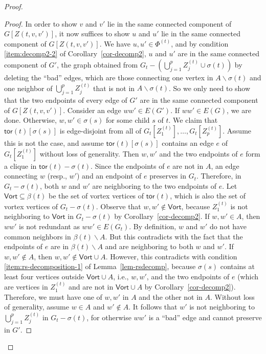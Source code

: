 \documentclass[a4paper,11pt]{article}
\numberwithin{lemma}{section}
\newenvironment{claimproof}{\begin{proof}\renewcommand{\qedsymbol}{$\lrcorner$}}{\end{proof}}
\newcommand{\tor}{\mathsf{tor}}
\begin{document}
\begin{proof}
\begin{claimproof}
In order to show $v$ and $v'$ lie in the same connected component of $G[Z(t,v,v')]$, it now suffices to show $u$ and $u'$ lie in the same connected component of $G[Z(t,v,v')]$.
We have $u,u' \in \varPhi^{(t)}$, and by condition \ref{item:decomp2-2} of Corollary~\ref{cor-decomp2}, $u$ and $u'$ are in the same connected component of $G'$, the graph obtained from $G_t - (\bigcup_{j=1}^p Z_j^{(t)} \cup \sigma(t))$ by deleting the ``bad'' edges, which are those connecting one vertex in $A \backslash \sigma(t)$ and one neighbor of $\bigcup_{j=1}^p Z_j^{(t)}$ that is not in $A \backslash \sigma(t)$.
So we only need to show that the two endpoints of every edge of $G'$ are in the same connected component of $G[Z(t,v,v')]$.
Consider an edge $ww' \in E(G')$.
If $ww' \in E(G)$, we are done.
Otherwise, $w,w' \in \sigma(s)$ for some child $s$ of $t$.
We claim that $\tor(t)[\sigma(s)]$ is edge-disjoint from all of $G_t[Z_1^{(t)}],\dots,G_t[Z_p^{(t)}]$.
Assume this is not the case, and assume $\tor(t)[\sigma(s)]$ contains an edge $e$ of $G_t[Z_1^{(t)}]$ without loss of generality.
Then $w,w'$ and the two endpoints of $e$ form a clique in $\tor(t) - \sigma(t)$.
Since the endpoints of $e$ are not in $A$, an edge connecting $w$ (resp., $w'$) and an endpoint of $e$ preserves in $G_t$.
Therefore, in $G_t - \sigma(t)$, both $w$ and $w'$ are neighboring to the two endpoints of $e$.
Let $\mathsf{Vort} \subseteq \beta(t)$ be the set of vortex vertices of $\tor(t)$, which is also the set of vortex vertices of $G_t - \sigma(t)$.
Observe that $w,w' \notin \mathsf{Vort}$, because $Z_1^{(t)}$ is not neighboring to $\mathsf{Vort}$ in $G_t - \sigma(t)$ by Corollary~\ref{cor-decomp2}.
If $w,w' \in A$, then $ww'$ is not redundant as $ww' \in E(G_t)$.
By definition, $w$ and $w'$ do not have common neighbors in $\beta(t) \backslash A$.
But this contradicts with the fact that the endpoints of $e$ are in $\beta(t) \backslash A$ and are neighboring to both $w$ and $w'$.
If $w,w' \notin A$, then $w,w' \notin \mathsf{Vort} \cup A$.
However, this contradicts with condition \ref{item:rs-decomposition-1} of Lemma~\ref{lem-rsdecomp}, because $\sigma(s)$ contains at least four vertices outside $\mathsf{Vort} \cup A$, i.e., $w,w'$, and the two endpoints of $e$ (which are vertices in $Z_1^{(t)}$ and are not in $\mathsf{Vort} \cup A$ by Corollary~\ref{cor-decomp2}).
Therefore, we must have one of $w,w'$ in $A$ and the other not in $A$.
Without loss of generality, assume $w \in A$ and $w' \notin A$.
It follows that $w'$ is not neighboring to $\bigcup_{j=1}^p Z_j^{(t)}$ in $G_t - \sigma(t)$, for otherwise $ww'$ is a ``bad'' edge and cannot preserve in $G'$.

\end{claimproof}
\end{proof}
\end{document}

